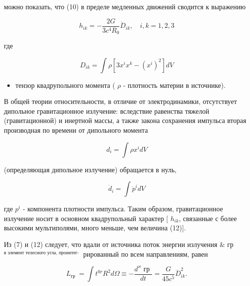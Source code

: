 \documentclass[10pt]{article}
\begin{document}
можно показать, что (10) в пределе медленных движений сводится к выражению



\[

h_{i k}=-\frac{2 G}{3 c^{4} R_{0}} \ddot{D}_{i k}, \quad i, k=1,2,3

\]



где



\[

D_{i k}=\int \rho\left[3 x^{i} x^{k}-\left(x^{i}\right)^{2}\right] d V

\]



\begin{itemize}

  \item тензор квадрупольного момента ( $\rho$ - плотность материи в источнике).

\end{itemize}



В общей теории относительности, в отличие от электродинамики, отсутствует дипольное гравитационное излучение: вследствие равенства тяжелой (гравитационной) и инертной массы, а также закона сохранения импульса вторая производная по времени от дипольного момента



\[

d_{i}=\int \rho x^{i} d V

\]



(определяющая дипольное излучение) обращается в нуль,



\[

\ddot{d}_{i}=\int \dot{p}^{i} d V

\]



где $p^{i}$ - компонента плотности импульса. Таким образом, гравитационное излучение носит в основном квадрупольный характер [ $h_{i k}$, связанные с более высокими мультиполями, много меньше, чем величина (12)].



Из (7) и (12) следует, что вдали от источника поток энергии излучения \& гр $^{\text {в элемент телесного угла, проинтег- }}$ рированный по всем направлениям, равен



\[

L_{\text {гр }}=\int t^{0 r} R^{2} d \Omega \equiv-\frac{d^{\varkappa} \text { гр }}{d t}=\frac{G}{45 c^{5}} \dddot{D}_{i k}^{2} .

\]
\end{document}
